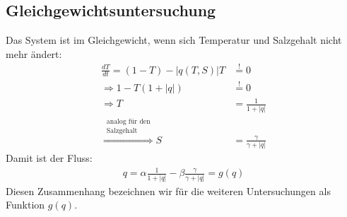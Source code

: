 \documentclass[a4paper,twoside]{article}
\begin{document}
	\subsection{Gleichgewichtsuntersuchung}
	Das System ist im Gleichgewicht, wenn sich Temperatur und Salzgehalt nicht mehr ändert:
	\begin{align*}
		\frac{dT}{dt} = (1 - T) - \left| q(T,S)\right|T &\stackrel{!}{=} 0 \\
		\Rightarrow 1 - T(1 + |q|) &\stackrel{!}{=} 0 \\
		\Rightarrow T &= \frac{1}{1 + |q|} \\
		\stackrel{
			\substack{
				\textrm{analog für den}\\
				\textrm{Salzgehalt}
			}
		}{\Rightarrow} S &= \frac{\gamma}{\gamma + |q|}
	\end{align*}
	Damit ist der Fluss:
	\begin{align*}
		q = \alpha \frac{1}{1 + |q|} - \beta \frac{\gamma}{\gamma + |q|} = g(q)
	\end{align*}
	Diesen Zusammenhang bezeichnen wir für die weiteren Untersuchungen als Funktion \(g(q)\).
	
\end{document}
